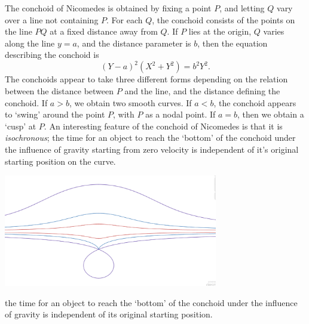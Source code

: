 \begin{example}
    The conchoid of Nicomedes is obtained by fixing a point $P$, and letting $Q$ vary over a line not containing $P$. For each $Q$, the conchoid consists of the points on the line $PQ$ at a fixed distance away from $Q$. If $P$ lies at the origin, $Q$ varies along the line $y = a$, and the distance parameter is $b$, then the equation describing the conchoid is
    \[ (Y-a)^2(X^2 + Y^2) = b^2Y^2. \]
    The conchoids appear to take three different forms depending on the relation between the distance between $P$ and the line, and the distance defining the conchoid. If $a > b$, we obtain two smooth curves. If $a < b$, the conchoid appears to `swing' around the point $P$, with $P$ as a nodal point. If $a = b$, then we obtain a `cusp' at $P$. An interesting feature of the conchoid of Nicomedes is that it is \emph{isochronous}; the time for an object to reach the `bottom' of the conchoid under the influence of gravity starting from zero velocity is independent of it's original starting position on the curve.
    \begin{center}
        \includegraphics[width=0.7\textwidth]{ConchoidNicomedes.png}
    \end{center}
    the time for an object to reach the `bottom' of the conchoid under the influence of gravity is independent of its original starting position.
\end{example}

